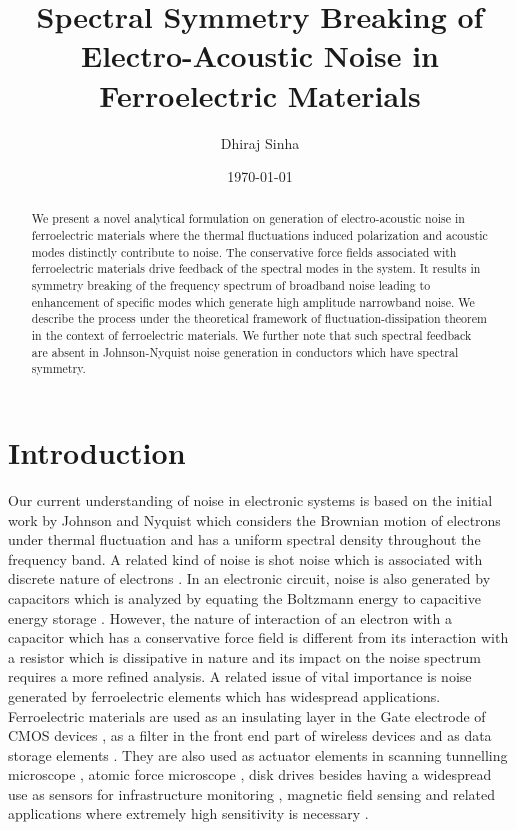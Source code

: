 \documentclass[12pt,column,showpacs,pre,preprintnumbers,amsmath,amssymb,aps,standalone]{revtex4-2}
\begin{document}
\title{Spectral Symmetry Breaking of Electro-Acoustic Noise in Ferroelectric Materials}
\author{Dhiraj Sinha}

\date{\today}
\begin{abstract}
We present a novel analytical formulation on generation of electro-acoustic noise in ferroelectric materials where the thermal fluctuations induced polarization and acoustic modes distinctly contribute to noise. The conservative force fields associated with ferroelectric materials drive feedback of the spectral modes in the system. It results in symmetry breaking of the frequency spectrum of broadband noise leading to enhancement of specific modes which generate high amplitude narrowband noise. We describe the process under the theoretical framework of fluctuation-dissipation theorem in the context of ferroelectric materials.  We further note that such spectral feedback are absent in Johnson-Nyquist noise generation in conductors which have spectral symmetry.\\[12pt]
 \end{abstract}
\maketitle
\section{Introduction}
Our current understanding of noise in electronic systems is based on the initial work by Johnson and Nyquist which considers the Brownian motion of electrons under thermal fluctuation \cite{1,2} and has a uniform spectral density throughout the frequency band. A related kind of noise is shot noise which is associated with discrete nature of electrons \cite{3}. In an electronic circuit, noise is also generated by capacitors which is analyzed by equating the Boltzmann energy to capacitive energy storage \cite{4}. However, the nature of interaction of an electron with a capacitor which has a conservative force field is different from its interaction with a resistor which is dissipative in nature and its impact on the noise spectrum requires a more refined analysis. A related issue of vital importance is noise generated by ferroelectric elements which has widespread applications. Ferroelectric materials are used as an insulating layer in the Gate electrode of CMOS devices \cite{5}, as a filter in the front end part of wireless devices \cite{6} and as data storage elements \cite{7}. They are also used as actuator elements in scanning tunnelling microscope \cite{8,9}, atomic force microscope \cite{10,11}, disk drives \cite{12} besides having a widespread use as  sensors for infrastructure monitoring \cite{13,14}, magnetic field sensing \cite{15} and related applications where extremely high sensitivity is necessary \cite{16}. 
\end{document}
